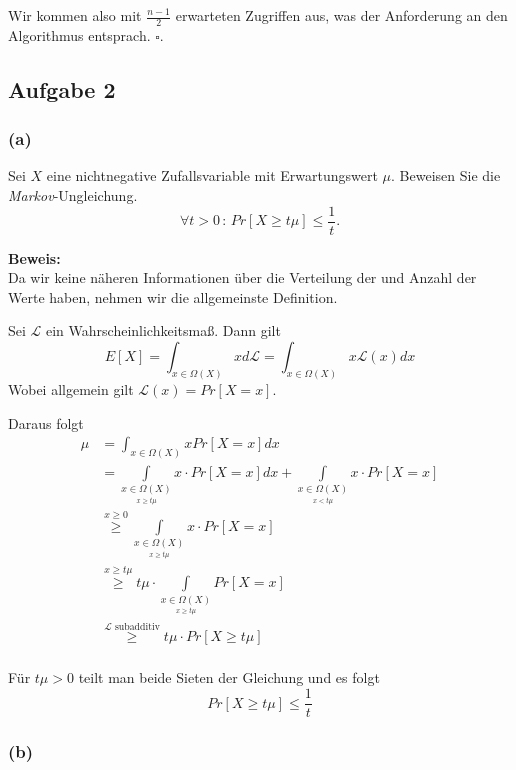 \documentclass[11pt,a4paper,ngerman]{article}
\begin{document}
    Wir kommen also mit $\frac{n-1}{2}$ erwarteten Zugriffen aus, was der Anforderung an den Algorithmus entsprach.
    \mbox{}\hfill$\square$.

\subsection*{Aufgabe 2}

\subsubsection*{(a)}
Sei $X$ eine nichtnegative Zufallsvariable mit Erwartungswert $\mu$. Beweisen Sie die \emph{Markov}-Ungleichung.
$$
    \forall t > 0 \, : \, Pr[X \geq t\mu] \leq \frac{1}{t}.
$$    

\textbf{Beweis:}\\

Da wir keine näheren Informationen über die Verteilung der und Anzahl der Werte haben, nehmen wir die allgemeinste
Definition.

Sei $\mathcal{L}$ ein Wahrscheinlichkeitsmaß.
Dann gilt
$$
    E[X] = \int_{x \in \Omega (X)} x d\mathcal{L} = \int_{x \in \Omega (X)} x \mathcal{L}(x) dx
$$
Wobei allgemein gilt $\mathcal{L}(x) = Pr[X = x]$.

Daraus folgt
\begin{equation*}\begin{split}
    \mu &= \int_{x \in \Omega (X)} x Pr[X = x] dx\\
        &= \underset{\underset{x \geq t \mu}{x \in \Omega (X)}}{\int} x \cdot Pr [X = x] dx + 
            \underset{\underset{x < t \mu}{x \in \Omega (X)}}{\int} x \cdot Pr [X = x]\\
        &\stackrel{x \geq 0}{\geq} \underset{\underset{x \geq t\mu}{ x\in \Omega (X)}}{\int} x \cdot Pr [X = x]\\
        &\stackrel{x \geq t \mu}{\geq} t \mu  \cdot \underset{\underset{x \geq t\mu}{ x \in \Omega (X) }}{\int} Pr [X = x]\\
        &\stackrel{\mathcal{L}\text{ subadditiv}}{\geq} t \mu \cdot Pr[X \geq t \mu]\\
\end{split}\end{equation*}

Für $t \mu > 0$ teilt man beide Sieten der Gleichung und es folgt
$$
    Pr[X \geq t \mu] \leq \frac{1}{t}
$$


\subsubsection*{(b)}
\end{document}
